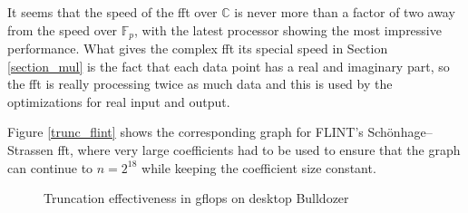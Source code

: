\documentclass[12 pt]{amsart}
\begin{document}
It seems that the speed of the fft over $\mathbb{C}$ is never more than a factor
of two away from the speed over $\mathbb{F}_p$, with the latest processor
showing the most impressive performance. What gives the complex fft its special
speed in Section \ref{section_mul} is the fact that each data point has a real
and imaginary part, so the fft is really processing twice as much data and this
is used by the optimizations for real input and output.

Figure \ref{trunc_flint} shows the corresponding graph for FLINT's
Sch\"onhage--Strassen fft, where very large coefficients had to be used to
ensure that the graph can continue to $n=2^{18}$ while keeping the coefficient
size constant.


\begin{figure}
\caption{Truncation effectiveness in gflops on desktop Bulldozer}
\label{figure_bull_trunc}
\end{figure}
\end{document}
